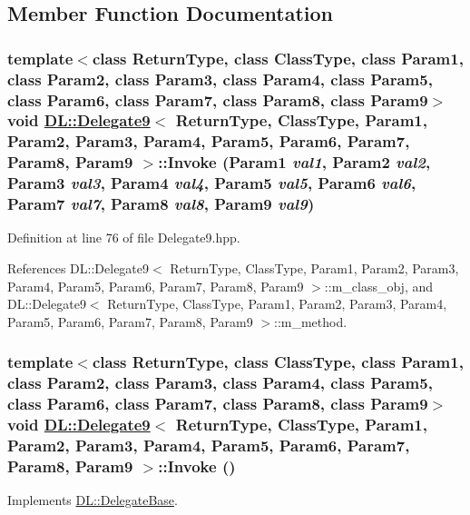 \subsection{Member Function Documentation}
\hypertarget{classDL_1_1Delegate9_a3}{
\subsubsection[Invoke]{\setlength{\rightskip}{0pt plus 5cm}template$<$class Return\-Type, class Class\-Type, class Param1, class Param2, class Param3, class Param4, class Param5, class Param6, class Param7, class Param8, class Param9$>$ void \hyperlink{classDL_1_1Delegate9}{DL::Delegate9}$<$ Return\-Type, Class\-Type, Param1, Param2, Param3, Param4, Param5, Param6, Param7, Param8, Param9 $>$::Invoke (Param1 {\em val1}, Param2 {\em val2}, Param3 {\em val3}, Param4 {\em val4}, Param5 {\em val5}, Param6 {\em val6}, Param7 {\em val7}, Param8 {\em val8}, Param9 {\em val9})}}
\label{classDL_1_1Delegate9_a3}




Definition at line 76 of file Delegate9.hpp.

References DL::Delegate9$<$ Return\-Type, Class\-Type, Param1, Param2, Param3, Param4, Param5, Param6, Param7, Param8, Param9 $>$::m\_\-class\_\-obj, and DL::Delegate9$<$ Return\-Type, Class\-Type, Param1, Param2, Param3, Param4, Param5, Param6, Param7, Param8, Param9 $>$::m\_\-method.\hypertarget{classDL_1_1Delegate9_a2}{
\subsubsection[Invoke]{\setlength{\rightskip}{0pt plus 5cm}template$<$class Return\-Type, class Class\-Type, class Param1, class Param2, class Param3, class Param4, class Param5, class Param6, class Param7, class Param8, class Param9$>$ void \hyperlink{classDL_1_1Delegate9}{DL::Delegate9}$<$ Return\-Type, Class\-Type, Param1, Param2, Param3, Param4, Param5, Param6, Param7, Param8, Param9 $>$::Invoke ()}}
\label{classDL_1_1Delegate9_a2}




Implements \hyperlink{classDL_1_1DelegateBase_a2}{DL::Delegate\-Base}.

